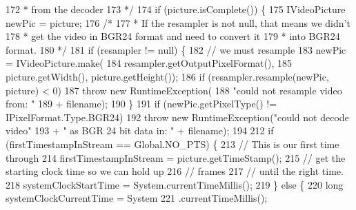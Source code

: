\begin{DoxyCode}
{}
172 \textcolor{comment}{                     * from the decoder
}
173 \textcolor{comment}{                     */}
174                     \textcolor{keywordflow}{if} (picture.isComplete()) \{
175                         IVideoPicture newPic = picture;
176                         \textcolor{comment}{/*}
177 \textcolor{comment}{                         * If the resampler is not null, that means we didn't
}
178 \textcolor{comment}{                         * get the video in BGR24 format and need to convert it
}
179 \textcolor{comment}{                         * into BGR24 format.
}
180 \textcolor{comment}{                         */}
181                         \textcolor{keywordflow}{if} (resampler != null) \{
182                             \textcolor{comment}{// we must resample}
183                             newPic = IVideoPicture.make(
184                                     resampler.getOutputPixelFormat(),
185                                     picture.getWidth(), picture.getHeight());
186                             \textcolor{keywordflow}{if} (resampler.resample(newPic, picture) < 0)
187                                 \textcolor{keywordflow}{throw} \textcolor{keyword}{new} RuntimeException(
188                                         \textcolor{stringliteral}{"could not resample video from: "}
189                                                 + filename);
190                         \}
191                         \textcolor{keywordflow}{if} (newPic.getPixelType() != IPixelFormat.Type.BGR24)
192                             \textcolor{keywordflow}{throw} \textcolor{keyword}{new} RuntimeException(\textcolor{stringliteral}{"could not decode video"}
193                                     + \textcolor{stringliteral}{" as BGR 24 bit data in: "} + filename);
194 
212                         \textcolor{keywordflow}{if} (firstTimestampInStream == Global.NO\_PTS) \{
213                             \textcolor{comment}{// This is our first time through}
214                             firstTimestampInStream = picture.getTimeStamp();
215                             \textcolor{comment}{// get the starting clock time so we can hold up}
216                             \textcolor{comment}{// frames}
217                             \textcolor{comment}{// until the right time.}
218                             systemClockStartTime = System.currentTimeMillis();
219                         \} \textcolor{keywordflow}{else} \{
220                             \textcolor{keywordtype}{long} systemClockCurrentTime = System
221                                     .currentTimeMillis();

\end{DoxyCode}
